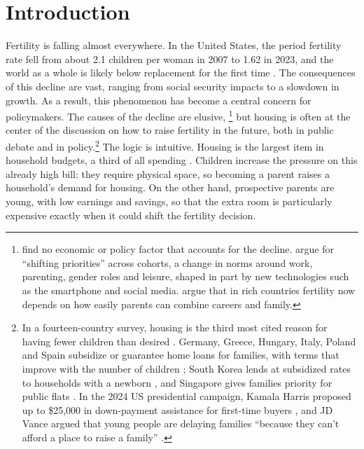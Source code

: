 \section{Introduction}
\label{sec:introduction}

Fertility is falling almost everywhere. In the United States, the period
fertility rate fell from about 2.1 children per woman in 2007 to 1.62 in
2023, and the world as a whole is likely below replacement for the first
time \citep{worldBankWDI,fernandezVillaverdeNorrickTerraIncognita2026}. The consequences of this decline are vast, ranging from social security impacts to a slowdown in growth. As a result, this phenomenon has become a central concern for policymakers. The causes of the decline are elusive,%
\footnote{\citet{kearneyPuzzleFallingUS2022} find no economic or policy
factor that accounts for the decline. \citet{kearneyLevineWhyFertilityLow2025}
argue for ``shifting priorities'' across cohorts, a change in norms around
work, parenting, gender roles and leisure, shaped in part by new technologies
such as the smartphone and social media.
\citet{doepkeEconomicsFertilityNew2023} argue that in rich countries fertility now depends on how easily parents can combine careers and family.} but housing is often at the center of the
discussion on how to raise fertility in the future, both in public debate and
in policy.\footnote{In a fourteen-country
survey, housing is the third most cited reason for having fewer children than
desired \citep{unfpaSWP2025}. Germany, Greece, Hungary, Italy, Poland and
Spain subsidize or guarantee home loans for families, with terms that improve
with the number of children
\citep{kfw300,greeceSpitiMou2,hungaryCSOKPlus,italyFondoPrimaCasa,polandFamilyRepayment,spainICOJovenes};
South Korea lends at subsidized rates to households with a newborn
\citep{koreaNewbornLoan}, and Singapore gives families priority for public
flats \citep{singaporeFPPS}. In the 2024 US presidential campaign, Kamala
Harris proposed up to \$25,000 in down-payment assistance for first-time
buyers \citep{harrisCampaign2024}, and JD Vance argued that young people are
delaying families ``because they can't afford a place to raise a family''
\citep{vanceNewsNation2024}.} The logic is intuitive. Housing is the largest item in household budgets, a third of all spending
\citep{blsConsumerExpenditures2024}.  Children increase the pressure on this already high bill: they require physical space, so becoming a parent raises a household's demand for housing. On the other hand, prospective parents are young, with low earnings and savings, so that the extra room is particularly expensive exactly when it could shift the fertility decision.

